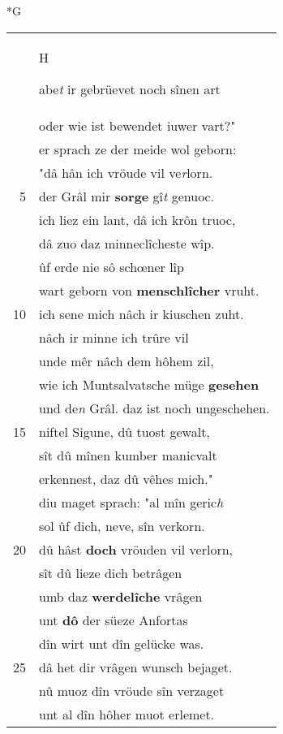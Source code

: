 \documentclass[8pt,a4paper,notitlepage]{article}
\begin{document}
\newpage
\begin{table}[ht]
\begin{minipage}[t]{0.5\linewidth}
\small
\begin{center}*G
\end{center}
\begin{tabular}{rl}
 & \begin{large}H\end{large}abe\textit{t} ir gebrüevet noch sînen art\\ 
 & oder wie ist bewendet iuwer vart?"\\ 
 & er sprach ze der meide wol geborn:\\ 
 & "dâ hân ich vröude vil ve\textit{r}lorn.\\ 
5 & der Grâl mir \textbf{sorge} gî\textit{t} genuoc.\\ 
 & ich liez ein lant, dâ ich krôn truoc,\\ 
 & dâ zuo daz minneclîcheste wîp.\\ 
 & ûf erde nie sô schœner lîp\\ 
 & wart geborn von \textbf{menschlîcher} vruht.\\ 
10 & ich sene mich nâch ir kiuschen zuht.\\ 
 & nâch ir minne ich trûre vil\\ 
 & unde mêr nâch dem hôhem zil,\\ 
 & wie ich Muntsalvatsche müge \textbf{gesehen}\\ 
 & und de\textit{n} Grâl. daz ist noch ungeschehen.\\ 
15 & niftel Sigune, dû tuost gewalt,\\ 
 & sît dû mînen kumber manicvalt\\ 
 & erkennest, daz dû vêhes mich."\\ 
 & diu maget sprach: "al mîn geric\textit{h}\\ 
 & sol ûf dich, neve, sîn verkorn.\\ 
20 & dû hâst \textbf{doch} vröuden vil verlorn,\\ 
 & sît dû lieze dich betrâgen\\ 
 & umb daz \textbf{werdelîche} vrâgen\\ 
 & unt \textbf{dô} der süeze Anfortas\\ 
 & dîn wirt unt dîn gelücke was.\\ 
25 & dâ het dir vrâgen wunsch bejaget.\\ 
 & nû muoz dîn vröude sîn verzaget\\ 
 & unt al dîn hôher muot erlemet.\\ 

\end{tabular}
\end{minipage}
\end{table}
\end{document}
